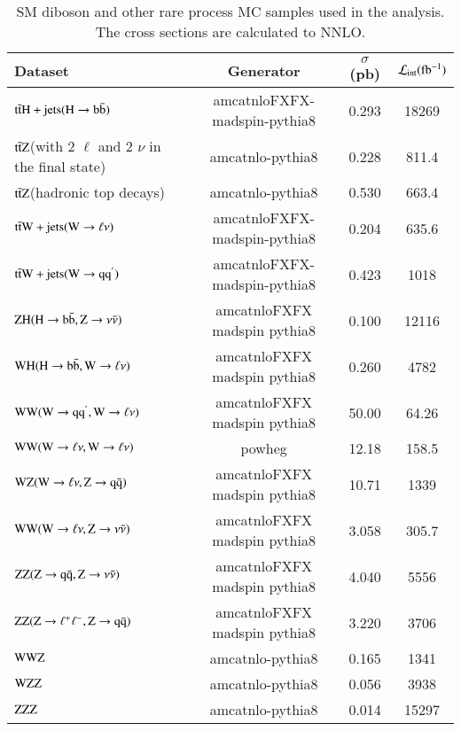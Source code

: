 \begin{table}[h]
\centering
\caption{SM diboson and other rare process MC samples used in the analysis. The cross
  sections are calculated to NNLO. }
\label{tab:rareMCsamples}
{\footnotesize
\begin{tabular}{lccc}
\hline \hline
Dataset & Generator & $\sigma$ (pb) & ${\cal L}_{\rm int}(\rm fb^{-1})$ \\
\hline
$\rm t\bar{t}H +jets (H\rightarrow b\bar{b})$   & amcatnloFXFX-madspin-pythia8 & 0.293 & 18269\\
$\rm t\bar{t}Z $(with 2 $\ell$ and 2 $\nu$ in the final state)  & amcatnlo-pythia8 & 0.228 & 811.4\\
$\rm t\bar{t}Z $(hadronic top decays)   & amcatnlo-pythia8 & 0.530 & 663.4\\
$\rm t\bar{t}W +jets (W\rightarrow \ell\nu)$  & amcatnloFXFX-madspin-pythia8 & 0.204 & 635.6\\
$\rm t\bar{t}W +jets (W\rightarrow qq^{'})$    & amcatnloFXFX-madspin-pythia8 & 0.423 & 1018\\
$\rm ZH (H\rightarrow b\bar{b},Z\rightarrow \nu\bar{\nu})$  &  amcatnloFXFX madspin pythia8 & 0.100 & 12116\\
$\rm WH (H\rightarrow b\bar{b},W\rightarrow \ell{\nu})$    & amcatnloFXFX madspin pythia8 & 0.260 & 4782\\
$\rm WW (W\rightarrow qq^{'},W\rightarrow \ell{\nu})$    & amcatnloFXFX madspin pythia8 & 50.00 & 64.26\\
$\rm WW (W\rightarrow \ell\nu,W\rightarrow \ell{\nu})$   & powheg & 12.18 & 158.5\\
$\rm WZ (W\rightarrow \ell\nu,Z\rightarrow q\bar{q})$&  amcatnloFXFX madspin pythia8 & 10.71 & 1339\\
$\rm WW (W\rightarrow \ell\nu,Z\rightarrow \nu\bar{\nu})$ &  amcatnloFXFX madspin pythia8 & 3.058 & 305.7\\
$\rm ZZ (Z\rightarrow q\bar{q},Z\rightarrow \nu\bar{\nu})$ & amcatnloFXFX madspin pythia8 & 4.040 & 5556\\
$\rm ZZ (Z\rightarrow \ell^{+}\ell^{-},Z\rightarrow q\bar{q})$ & amcatnloFXFX madspin pythia8 & 3.220 & 3706\\
$\rm WWZ$  & amcatnlo-pythia8 & 0.165 & 1341\\
$\rm WZZ$ & amcatnlo-pythia8 & 0.056 & 3938\\
$\rm ZZZ$  & amcatnlo-pythia8 & 0.014 & 15297\\
\hline \hline
\end{tabular}
}
\end{table}



